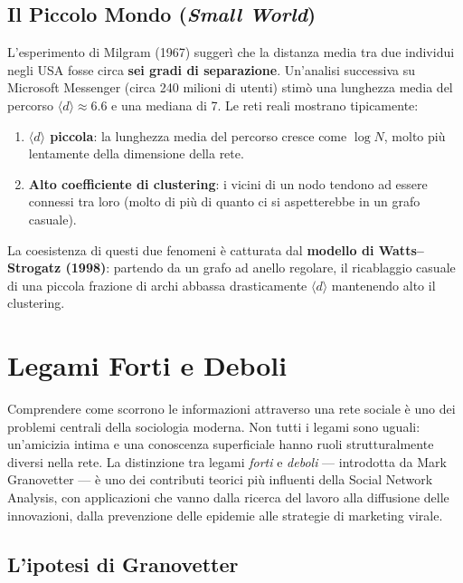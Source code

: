 \documentclass[12pt,a4paper]{article}
\begin{document}
\subsection{Il Piccolo Mondo (\textit{Small World})}

L'esperimento di Milgram (1967) suggerì che la distanza media tra due individui negli USA
fosse circa \textbf{sei gradi di separazione}. Un'analisi successiva su Microsoft Messenger
(circa 240 milioni di utenti) stimò una lunghezza media del percorso $\langle d \rangle \approx 6.6$
e una mediana di 7. Le reti reali mostrano tipicamente:
\begin{enumerate}
  \item \textbf{$\langle d \rangle$ piccola}: la lunghezza media del percorso cresce come $\log N$,
        molto più lentamente della dimensione della rete.
  \item \textbf{Alto coefficiente di clustering}: i vicini di un nodo tendono ad essere
        connessi tra loro (molto di più di quanto ci si aspetterebbe in un grafo casuale).
\end{enumerate}
La coesistenza di questi due fenomeni è catturata dal \textbf{modello di Watts–Strogatz (1998)}:
partendo da un grafo ad anello regolare, il ricablaggio casuale di una piccola frazione di archi
abbassa drasticamente $\langle d \rangle$ mantenendo alto il clustering.

\section{Legami Forti e Deboli}

Comprendere come scorrono le informazioni attraverso una rete sociale è uno dei problemi
centrali della sociologia moderna. Non tutti i legami sono uguali: un'amicizia intima
e una conoscenza superficiale hanno ruoli strutturalmente diversi nella rete. La distinzione
tra legami \emph{forti} e \emph{deboli} — introdotta da Mark Granovetter — è uno dei
contributi teorici più influenti della Social Network Analysis, con applicazioni che vanno
dalla ricerca del lavoro alla diffusione delle innovazioni, dalla prevenzione delle
epidemie alle strategie di marketing virale.

\subsection{L'ipotesi di Granovetter}
\end{document}
